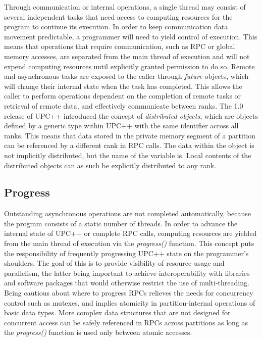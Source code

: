 \documentclass{uit-report}
\begin{document}
Through communication or internal operations, a single thread may consist of several independent tasks that need access to computing resources for the program to continue its execution. In order to keep communication data movement predictable, a programmer will need to yield control of execution. This means that operations that require communication, such as RPC or global memory accesses, are separated from the main thread of execution and will not expend computing resources until explicitly granted permission to do so. Remote and asynchronous tasks are exposed to the caller through \emph{future} objects, which will change their internal state when the task has completed. This allows the caller to perform operations dependent on the completion of remote tasks or retrieval of remote data, and effectively communicate between ranks.
\newpage
The 1.0 release of UPC++ introduced the concept of \emph{distributed objects}, which are objects defined by a generic type within UPC++ with the same identifier across all ranks. This means that data stored in the private memory segment of a partition can be referenced by a different rank in RPC calls. The data within the object is not implicitly distributed, but the name of the variable is. Local contents of the distributed objects can as such be explicitly distributed to any rank.

\subsection{Progress}
Outstanding asynchronous operations are not completed automatically, because the program consists of a static number of threads. In order to advance the internal state of UPC++ or complete RPC calls, computing resources are yielded from the main thread of execution via the \emph{progress()} function. This concept puts the responsibility of frequently progressing UPC++ state on the programmer's shoulders. The goal of this is to provide visibility of resource usage and parallelism, the latter being important to achieve interoperability with libraries and software packages that would otherwise restrict the use of multi-threading. Being cautious about where to progress RPCs relieves the needs for concurrency control such as mutexes, and implies atomicity in partition-internal operations of basic data types. More complex data structures that are not designed for concurrent access can be safely referenced in RPCs across partitions as long as the \emph{progress()} function is used only between atomic accesses.
\end{document}

